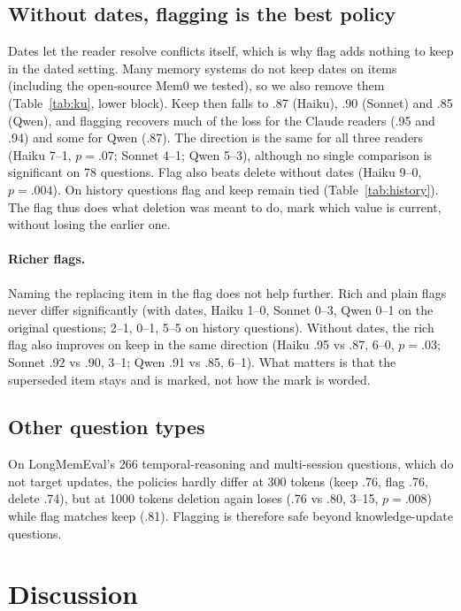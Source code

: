 \documentclass[11pt]{article}
\begin{document}
\subsection{Without dates, flagging is the best policy}
\label{sec:nodates}

Dates let the reader resolve conflicts itself, which is why flag adds nothing to keep in the dated
setting. Many memory systems do not keep dates on items (including the open-source Mem0 we tested),
so we also remove them (Table~\ref{tab:ku}, lower block). Keep then falls to .87 (Haiku), .90
(Sonnet) and .85 (Qwen), and flagging recovers much of the loss for the Claude readers (.95 and .94) and some for Qwen (.87). The direction is
the same for all three readers (Haiku 7--1, $p=.07$; Sonnet 4--1; Qwen 5--3), although no single
comparison is significant on 78 questions. Flag also beats delete without dates (Haiku 9--0,
$p=.004$). On history questions flag and keep remain tied (Table~\ref{tab:history}). The flag thus
does what deletion was meant to do, mark which value is current, without losing the earlier one.

\paragraph{Richer flags.} Naming the replacing item in the flag does not help further. Rich and plain
flags never differ significantly (with dates, Haiku 1--0, Sonnet 0--3, Qwen 0--1 on the original
questions; 2--1, 0--1, 5--5 on history questions). Without dates, the rich flag also improves on keep
in the same direction (Haiku .95 vs .87, 6--0, $p=.03$; Sonnet .92 vs .90, 3--1; Qwen .91 vs .85,
6--1). What matters is that the superseded item stays and is marked, not how the mark is worded.

\subsection{Other question types}

On LongMemEval's 266 temporal-reasoning and multi-session questions, which do not target updates,
the policies hardly differ at 300 tokens (keep .76, flag .76, delete .74), but at 1000 tokens deletion
again loses (.76 vs .80, 3--15, $p=.008$) while flag matches keep (.81). Flagging is therefore safe
beyond knowledge-update questions.

\section{Discussion}
\label{sec:discussion}
\end{document}
